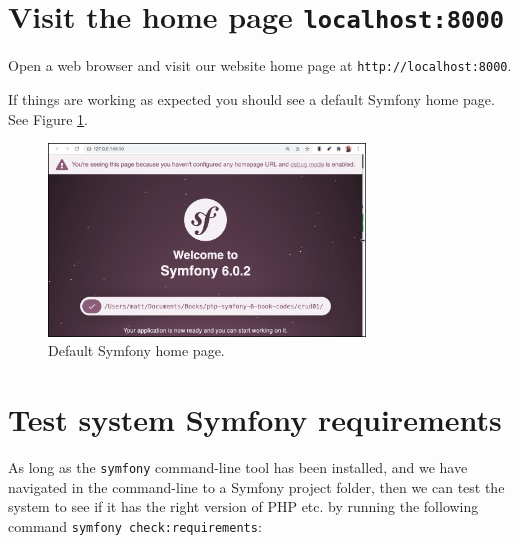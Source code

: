 \documentclass[a4paperpaper,openright]{book}
\begin{document}
\hypertarget{visit-the-home-page-localhost8000}{%
\section{\texorpdfstring{Visit the home page
\texttt{localhost:8000}}{Visit the home page localhost:8000}}\label{visit-the-home-page-localhost8000}}

Open a web browser and visit our website home page at
\texttt{http://localhost:8000}.

If things are working as expected you should see a default Symfony home
page. See Figure \ref{homepage}.

\begin{figure}
\centering
\includegraphics[width=0.75\textwidth,height=\textheight]{./tex2pdf.-b567767c1af560fd/7a430dcb3125bbcf87bbbecc80178ddec044edda.png}
\caption{Default Symfony home page. \label{homepage}}
\end{figure}

\hypertarget{test-system-symfony-requirements}{%
\section{Test system Symfony
requirements}\label{test-system-symfony-requirements}}

As long as the \texttt{symfony} command-line tool has been installed,
and we have navigated in the command-line to a Symfony project folder,
then we can test the system to see if it has the right version of PHP
etc. by running the following command
\texttt{symfony\ check:requirements}:
\end{document}
